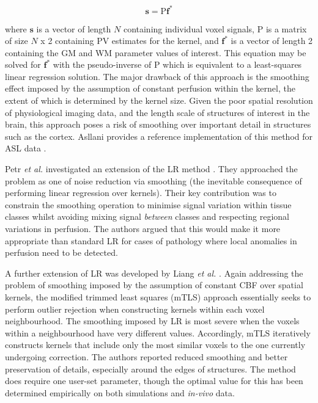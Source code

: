\documentclass[12pt]{report}
\newcommand{\mat}[1]{\mathrm{#1}}
\renewcommand{\vec}[1]{\mathbf{#1}}
\begin{document}
\begin{equation}
\vec{s} = \mat{P} \vec{f^*}
\end{equation} 

where $\vec{s}$ is a vector of length $N$ containing individual voxel signals, $\mat{P}$ is a matrix of size $N$ x 2 containing PV estimates for the kernel, and $\vec{f^*}$ is a vector of length 2 containing the GM and WM parameter values of interest. This equation may be solved for $\vec{f^*}$ with the pseudo-inverse of $\mat{P}$ which is equivalent to a least-squares linear regression solution. The major drawback of this approach is the smoothing effect imposed by the assumption of constant perfusion within the kernel, the extent of which is determined by the kernel size. Given the poor spatial resolution of physiological imaging data, and the length scale of structures of interest in the brain, this approach poses a risk of smoothing over important detail in structures such as the cortex. Asllani provides a reference implementation of this method for ASL data \cite{Asllani2008}. 

Petr \textit{et al.} investigated an extension of the LR method \cite{Petr2010}. They approached the problem as one of noise reduction via smoothing (the inevitable consequence of performing linear regression over kernels). Their key contribution was to constrain the smoothing operation to minimise signal variation within tissue classes whilst avoiding mixing signal \textit{between} classes and respecting regional variations in perfusion. The authors argued that this would make it more appropriate than standard LR for cases of pathology where local anomalies in perfusion need to be detected. 

A further extension of LR was developed by Liang \textit{et al.} \cite{Liang2013}. Again addressing the problem of smoothing imposed by the assumption of constant CBF over spatial kernels, the modified trimmed least squares (mTLS) approach essentially seeks to perform outlier rejection when constructing kernels within each voxel neighbourhood. The smoothing imposed by LR is most severe when the voxels within a neighbourhood have very different values. Accordingly, mTLS iteratively constructs kernels that include only the most similar voxels to the one currently undergoing correction. The authors reported reduced smoothing and better preservation of details, especially around the edges of structures. The method does require one user-set parameter, though the optimal value for this has been determined empirically on both simulations and \textit{in-vivo} data. 
\end{document}
